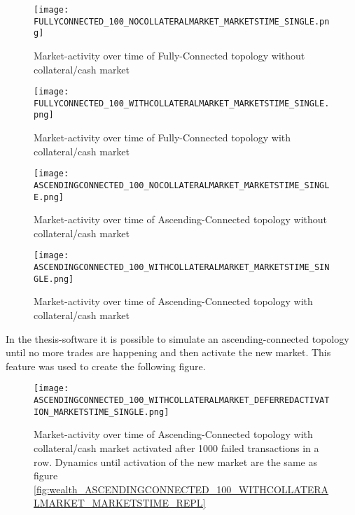 \documentclass[Bachelorarbeit.tex]{subfiles}
\begin{document}
\begin{figure}[H]
	\centering
  \texttt{[image: FULLYCONNECTED\_100\_NOCOLLATERALMARKET\_MARKETSTIME\_SINGLE.png]}
  	\caption{Market-activity over time of Fully-Connected topology without collateral/cash market}
	\label{fig:wealth_FULLYCONNECTED_100_NOCOLLATERALMARKET_MARKETSTIME_SINGLE}
\end{figure}

\begin{figure}[H]
	\centering
  \texttt{[image: FULLYCONNECTED\_100\_WITHCOLLATERALMARKET\_MARKETSTIME\_SINGLE.png]}
  	\caption{Market-activity over time of Fully-Connected topology with collateral/cash market}
	\label{fig:wealth_FULLYCONNECTED_100_WITHCOLLATERALMARKET_MARKETSTIME_SINGLE}
\end{figure}


\begin{figure}[H]
	\centering
  \texttt{[image: ASCENDINGCONNECTED\_100\_NOCOLLATERALMARKET\_MARKETSTIME\_SINGLE.png]}
	\caption{Market-activity over time of Ascending-Connected topology without collateral/cash market}
	\label{fig:wealth_ASCENDINGCONNECTED_100_NOCOLLATERALMARKET_MARKETSTIME_SINGLE}
\end{figure}

\begin{figure}[H]
	\centering
  \texttt{[image: ASCENDINGCONNECTED\_100\_WITHCOLLATERALMARKET\_MARKETSTIME\_SINGLE.png]}
	\caption{Market-activity over time of Ascending-Connected topology with collateral/cash market}
	\label{fig:wealth_ASCENDINGCONNECTED_100_WITHCOLLATERALMARKET_MARKETSTIME_SINGLE}
\end{figure}

In the thesis-software it is possible to simulate an ascending-connected topology until no more trades are happening and then activate the new market. This feature was used to create the following figure.

\begin{figure}[H]
	\centering
  \texttt{[image: ASCENDINGCONNECTED\_100\_WITHCOLLATERALMARKET\_DEFERREDACTIVATION\_MARKETSTIME\_SINGLE.png]}
	\caption{Market-activity over time of Ascending-Connected topology with collateral/cash market activated after 1000 failed transactions in a row. Dynamics until activation of the new market are the same as figure \ref{fig:wealth_ASCENDINGCONNECTED_100_WITHCOLLATERALMARKET_MARKETSTIME_REPL}}
		\label{fig:wealth_ASCENDINGCONNECTED_100_WITHCOLLATERALMARKET_DEFERREDACTIVATION_MARKETSTIME_SINGLE}
\end{figure}
\end{document}
